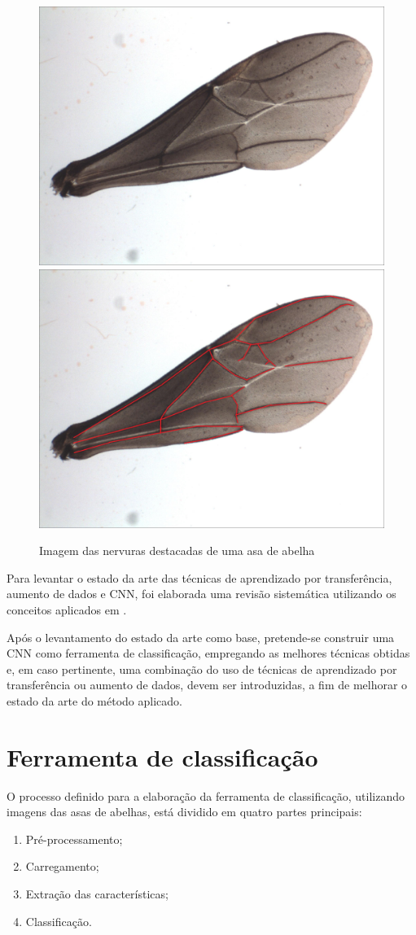 \documentclass[
	12pt,				%
	oneside,			%
	a4paper,			%
	english,			%
	brazil				%
	]{abntex2ppgsi}
\begin{document}
\begin{figure}[H]
    \centering
    \caption{Imagem das nervuras destacadas de uma asa de abelha}
    \includegraphics[width=.45\textwidth]{imagens/materiais_metodos/02_mel_trigona_spinipes.jpg}\hfill
    \includegraphics[width=.45\textwidth]{imagens/materiais_metodos/02_mel_trigona_spinipes_mapped.jpg}
    \label{fig:02_mel_trigona_spinipes}
\end{figure}

Para levantar o estado da arte das técnicas de aprendizado por transferência, aumento de dados e CNN, foi elaborada uma revisão sistemática utilizando os conceitos aplicados em .

Após o levantamento do estado da arte como base, pretende-se construir uma CNN como ferramenta de classificação, empregando as melhores técnicas obtidas e, em caso pertinente, uma combinação do uso de técnicas de aprendizado por transferência ou aumento de dados, devem ser introduzidas, a fim de melhorar o estado da arte do método aplicado.

\section{Ferramenta de classificação}
O processo definido para a elaboração da ferramenta de classificação, utilizando imagens das asas de abelhas, está dividido em quatro partes principais:

\begin{enumerate}
  \item Pré-processamento;
  \item Carregamento;
  \item Extração das características;
  \item Classificação.
\end{enumerate}
\end{document}
